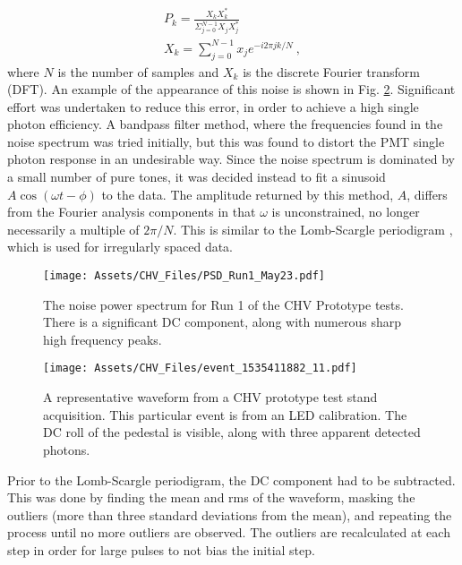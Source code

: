 \begin{align}
    P_k = \frac{X_k X_k^*} { \Sigma_{j=0}^{N-1} X_j X_j^*}\\
    X_k = \sum_{j=0}^{N-1} x_j e^{-i 2 \pi jk / N}~,
\end{align}
\noindent
where $N$ is the number of samples and $X_k$ is the discrete Fourier transform (DFT).
An example of the appearance of this noise is shown in Fig. \ref{fig:ch_event}.
Significant effort was undertaken to reduce this error, in order to achieve a high single photon efficiency.
A bandpass filter method, where the frequencies found in the noise spectrum was  tried initially, but this was found to distort the PMT single photon response in an undesirable way.
Since the noise spectrum is dominated by a small number of pure tones, it was decided instead to fit a sinusoid $A\cos( \omega t - \phi)$ to the data.
The amplitude returned by this method, $A$, differs from the Fourier analysis components in that $\omega$ is unconstrained, no longer necessarily a multiple of $2\pi/N$.
This is similar to the Lomb-Scargle periodigram \cite{lomb_least-squares_1976}, which is used for irregularly spaced data.

\begin{figure}
    \centering
    \texttt{[image: Assets/CHV\_Files/PSD\_Run1\_May23.pdf]}
    \caption[The noise power spectrum for Run 1 of the CHV Prototype tests. ]%
    {The noise power spectrum for Run 1 of the CHV Prototype tests. 
    There is a significant DC component, along with numerous sharp high frequency peaks.}
    \label{fig:chv_psd}
\end{figure}
\begin{figure}
    \centering
    \texttt{[image: Assets/CHV\_Files/event\_1535411882\_11.pdf]}
    \caption[A representative waveform from a CHV prototype test stand acquisition.]%
    {A representative waveform from a CHV prototype test stand acquisition.
    This particular event is from an LED calibration.
    The DC roll of the pedestal is visible, along with three apparent detected photons.}
    \label{fig:ch_event}
\end{figure}


Prior to the Lomb-Scargle periodigram, the DC component had to be subtracted. 
This was done by finding the mean and rms of the waveform, masking the outliers (more than three standard deviations from the mean), and repeating the process until no more outliers are observed.
The outliers are recalculated at each step in order for large pulses to not bias the initial step.

